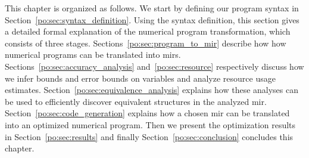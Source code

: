 This chapter is organized as follows.  We start by defining our program
syntax in Section~\ref{po:sec:syntax_definition}.  Using the syntax
definition, this section gives a detailed formal explanation of the
numerical program transformation, which consists of three stages.
Sections~\ref{po:sec:program_to_mir} describe how how numerical programs can
be translated into \glspl{mir}.  Sections~\ref{po:sec:accuracy_analysis}
and~\ref{po:sec:resource} respectively discuss how we infer bounds
and error bounds on variables and analyze resource usage estimates.
Section~\ref{po:sec:equivalence_analysis} explains how these analyses can
be used to efficiently discover equivalent structures in the analyzed
\gls{mir}\@.  Section~\ref{po:sec:code_generation} explains how a chosen
\gls{mir} can be translated into an optimized numerical program.  Then we
present the optimization results in Section~\ref{po:sec:results} and finally
Section~\ref{po:sec:conclusion} concludes this chapter.
